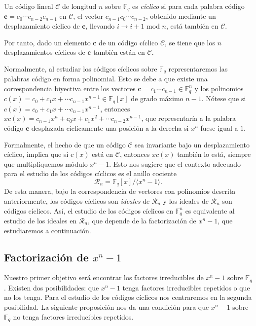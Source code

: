 \begin{definicion}
Un código lineal $\mathcal{C}$ de longitud $n$ sobre $\mathbb{F}_q$ es \emph{cíclico} si para cada palabra código $\mathbf{c} = c_0\cdots c_{n-2}c_{n-1}$ en $\mathcal{C}$, el vector $c_{n-1}c_0\cdots c_{n-2}$, obtenido mediante un desplazamiento cíclico de $\mathbf{c}$, llevando $i \rightarrow i+1$ mod $n$, está también en $\mathcal{C}$.
\end{definicion}

Por tanto, dado un elemento $\mathbf{c}$ de un código cíclico $\mathcal{C}$, se tiene que los $n$ desplazamientos cíclicos de $\mathbf{c}$ también están en $\mathcal{C}$.

Normalmente, al estudiar los códigos cíclicos sobre $\mathbb{F}_q$ representaremos las palabras código en forma polinomial. Esto se debe a que existe una correspondencia biyectiva entre los vectores $\mathbf{c} = c_1\cdots c_{n-1} \in \mathbb{F}_{q}^n$ y los polinomios $c(x) = c_0 + c_1x + \cdots c_{n-1}x^{n-1} \in \mathbb{F}_q[x]$ de grado máximo $n-1$. Nótese que si $c(x) =  c_0 + c_1x + \cdots c_{n-1}x^{n-1}$, entonces $xc(x) =  c_{n-1}x^{n} + c_0x + c_1x^2 + \cdots c_{n-2}x^{n-1}$, que representaría a la palabra código $\mathbf{c}$ desplazada cíclicamente una posición a la derecha si $x^n$ fuese igual a $1$. 

Formalmente, el hecho de que un código $\mathcal{C}$ sea invariante bajo un desplazamiento cíclico, implica que si $c(x)$ está en $\mathcal{C}$, entonces $xc(x)$ también lo está, siempre que multipliquemos módulo $x^n-1$. Esto nos sugiere que el contexto adecuado para el estudio de los códigos cíclicos es el anillo cociente $$\mathcal{R}_n = \mathbb{F}_q[x]/\langle x^n-1 \rangle.$$
De esta manera, bajo la correspondencia de vectores con polinomios descrita anteriormente, los códigos cíclicos son \emph{ideales} de $\mathcal{R}_n$ y los ideales de $\mathcal{R}_n$ son códigos cíclicos. Así, el estudio de los códigos cíclicos en $\mathbb{F}_{q}^n$ es equivalente al estudio de los ideales en $\mathcal{R}_n$, que depende de la factorización de $x^n-1$, que estudiaremos a continuación.



\subsection{Factorización de $x^n-1$}

Nuestro primer objetivo será encontrar los factores irreducibles de $x^n-1$ sobre $\mathbb{F}_q$. Existen dos posibilidades: que $x^n-1$ tenga factores irreducibles repetidos o que no los tenga. Para el estudio de los códigos cíclicos nos centraremos en la segunda posibilidad. La siguiente proposición nos da una condición para que $x^n-1$ sobre $\mathbb{F}_q$ no tenga factores irreducibles repetidos.

